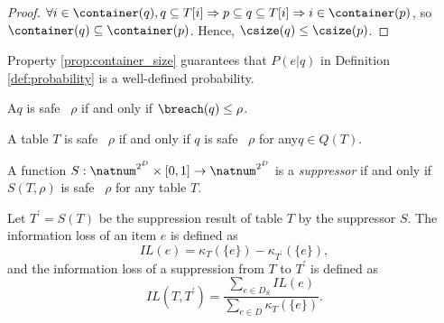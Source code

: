 \begin{proof}
  $\forall i\in\container(q), q\subseteq T[i]\Rightarrow p\subseteq q\subseteq T[i] \Rightarrow i\in\container(p)$,
  so $\container(q)\subseteq\container(p)$. Hence, $\csize(q)\leq \csize(p)$.
\end{proof}

Property \ref{prop:container_size} guarantees that $P(e|q)$ in Definition \ref{def:probability} is a well-defined probability.

\begin{definition}%
\label{def:safety_qid}
A\qid $q$ is safe \wrt~$\rho$ if and only if $\breach(q)\leq\rho$.
\end{definition}

\begin{definition}%
\label{def:safety_table}
A table $T$ is safe \wrt~$\rho$ if and only if $q$ is safe \wrt~$\rho$ for any\qid $q\in Q(T)$.
\end{definition}

\begin{definition}[Suppressor]
\label{def:suppressor}
A function $S : \natnum^{2^D}\times[0,1]\rightarrow\natnum^{2^D}$ is a \emph{suppressor} if and only if $S(T,\rho)$ is safe \wrt~$\rho$ for any table $T$.
\end{definition}

\begin{definition}
\label{def:infoloss}
Let $T^\prime = S(T)$ be the suppression result of table $T$ by the suppressor $S$.
The information loss of an item $e$ is defined as
\[ IL(e) = \kappa_T(\{e\}) - \kappa_{T^\prime}(\{e\}), \]
and the information loss of a suppression from $T$ to $T^\prime$ is defined as
\[ IL(T,T^\prime) = \frac{\sum_{e\in D_S}IL(e)}{\sum_{e\in D}\kappa_T(\{e\})}. \]
\end{definition}

